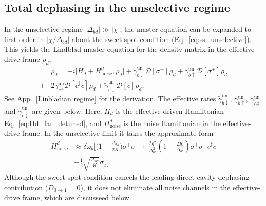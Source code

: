 \subsection{Total dephasing in the unselective regime}
\label{subsec:unselective-dephasing}

In the unselective regime $|\Delta_{bd}|\gg|\chi|$, the master equation can be expanded to first order in $|\chi/\Delta_{bd}|$ about the sweet-spot condition (Eq.\ \eqref{eq:ss_unselective}). This yields the Lindblad master equation for the density matrix in the effective drive frame $\rho_d$,
\begin{align}
\label{eq:Ldiss_unselective}
&\dot{\rho}_d = -i \bigl[ H_d + H_{\text{noise}}^d , \rho_d \bigr] \nonumber 
+ \widetilde{\gamma}_{b\downarrow}^{\mathrm{un}} \mathcal{D}[\sigma^-]\rho_d
+ \gamma_{b\uparrow}^{\mathrm{un}} \mathcal{D}[\sigma^+]\rho_d\\
+ &2\gamma_{c\phi}^{\mathrm{un}} \mathcal{D}[c^\dagger c]\rho_d
+ \widetilde{\gamma}_{c\downarrow}^{\mathrm{un}} \mathcal{D}[c]\rho_d,
\end{align}
See App.~\ref{Linbladian regime} for the derivation.
The effective rates $\widetilde{\gamma}_{b\downarrow}^{\mathrm{un}}$, $\gamma_{b\uparrow}^{\mathrm{un}}$, $\gamma_{c\phi}^{\mathrm{un}}$, and $\widetilde{\gamma}_{c\downarrow}^{\mathrm{un}}$ are given below.
Here, $H_d$ is the effective driven Hamiltonian Eq.\ \eqref{eq:Hd_far_detuned}, and $H_{\text{noise}}^d$ is the noise Hamiltonian in the effective-drive frame. In the unselective limit it takes the approximate form
\begin{align}
\label{eq:Hnoise_unselective}
H_{\text{noise}}^d &\approx \delta \omega_b \Bigg[ \big(1- \frac{\Delta_{bd}}{2K}\big) \sigma^+ \sigma^- \nonumber+ \frac{2 g^2}{\Delta_{bc}^2} \left( 1 - \frac{2 K}{\Delta_{bc}} \right) \sigma^+ \sigma^- c^\dagger c  
\\
&-\frac{1}{2} \sqrt{\frac{\Delta_{bd}}{K}} \sigma_x \Bigg].
\end{align}
Although the sweet-spot condition cancels the leading direct cavity-dephasing contribution (\(D_{0\to1}=0\)), it does not eliminate all noise channels in the effective-drive frame, which are discusseed below.
